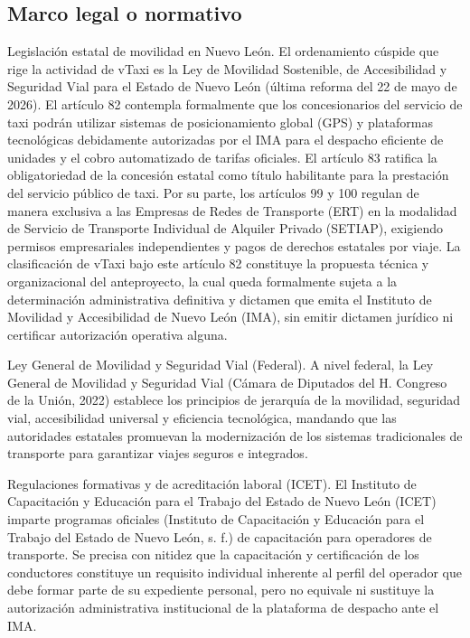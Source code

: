{\subsection{Marco legal o normativo}
Legislación estatal de movilidad en Nuevo León. El ordenamiento cúspide que rige la actividad de vTaxi es la Ley de Movilidad Sostenible, de Accesibilidad y Seguridad Vial para el Estado de Nuevo León (última reforma del 22 de mayo de 2026). El artículo 82 contempla formalmente que los concesionarios del servicio de taxi podrán utilizar sistemas de posicionamiento global (GPS) y plataformas tecnológicas debidamente autorizadas por el IMA para el despacho eficiente de unidades y el cobro automatizado de tarifas oficiales. El artículo 83 ratifica la obligatoriedad de la concesión estatal como título habilitante para la prestación del servicio público de taxi. Por su parte, los artículos 99 y 100 regulan de manera exclusiva a las Empresas de Redes de Transporte (ERT) en la modalidad de Servicio de Transporte Individual de Alquiler Privado (SETIAP), exigiendo permisos empresariales independientes y pagos de derechos estatales por viaje. La clasificación de vTaxi bajo este artículo 82 constituye la propuesta técnica y organizacional del anteproyecto, la cual queda formalmente sujeta a la determinación administrativa definitiva y dictamen que emita el Instituto de Movilidad y Accesibilidad de Nuevo León (IMA), sin emitir dictamen jurídico ni certificar autorización operativa alguna.


Ley General de Movilidad y Seguridad Vial (Federal). A nivel federal, la Ley General de Movilidad y Seguridad Vial (Cámara de Diputados del H. Congreso de la Unión, 2022) establece los principios de jerarquía de la movilidad, seguridad vial, accesibilidad universal y eficiencia tecnológica, mandando que las autoridades estatales promuevan la modernización de los sistemas tradicionales de transporte para garantizar viajes seguros e integrados.


Regulaciones formativas y de acreditación laboral (ICET). El Instituto de Capacitación y Educación para el Trabajo del Estado de Nuevo León (ICET) imparte programas oficiales (Instituto de Capacitación y Educación para el Trabajo del Estado de Nuevo León, s. f.) de capacitación para operadores de transporte. Se precisa con nitidez que la capacitación y certificación de los conductores constituye un requisito individual inherente al perfil del operador que debe formar parte de su expediente personal, pero no equivale ni sustituye la autorización administrativa institucional de la plataforma de despacho ante el IMA.


}
